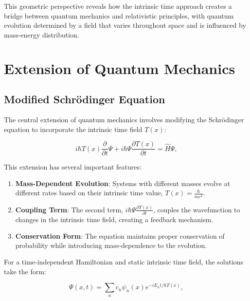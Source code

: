 \documentclass[12pt,a4paper]{article}
\newcommand{\Tfield}{T(x)}
\begin{document}
	This geometric perspective reveals how the intrinsic time approach creates a bridge between quantum mechanics and relativistic principles, with quantum evolution determined by a field that varies throughout space and is influenced by mass-energy distribution.
	
	\section{Extension of Quantum Mechanics}
	\label{sec:qm_extension}
	
	\subsection{Modified Schrödinger Equation}
	\label{subsec:modified_schrodinger}
	
	The central extension of quantum mechanics involves modifying the Schrödinger equation to incorporate the intrinsic time field $\Tfield$:
	
	\begin{equation}
		i\hbar \Tfield \frac{\partial}{\partial t} \Psi + i\hbar \Psi \frac{\partial \Tfield}{\partial t} = \hat{H} \Psi,
		\label{eq:modified_schrodinger}
	\end{equation}
	
	This extension has several important features:
	
	\begin{enumerate}
		\item \textbf{Mass-Dependent Evolution}: Systems with different masses evolve at different rates based on their intrinsic time value, $\Tfield = \frac{\hbar}{mc^2}$.
		
		\item \textbf{Coupling Term}: The second term, $i\hbar \Psi \frac{\partial \Tfield}{\partial t}$, couples the wavefunction to changes in the intrinsic time field, creating a feedback mechanism.
		
		\item \textbf{Conservation Form}: The equation maintains proper conservation of probability while introducing mass-dependence to the evolution.
	\end{enumerate}
	
	For a time-independent Hamiltonian and static intrinsic time field, the solutions take the form:
	
	\begin{equation}
		\Psi(x,t) = \sum_n c_n \psi_n(x) e^{-iE_n t / \hbar \Tfield},
		\label{eq:modified_solution}
	\end{equation}
	
\end{document}
